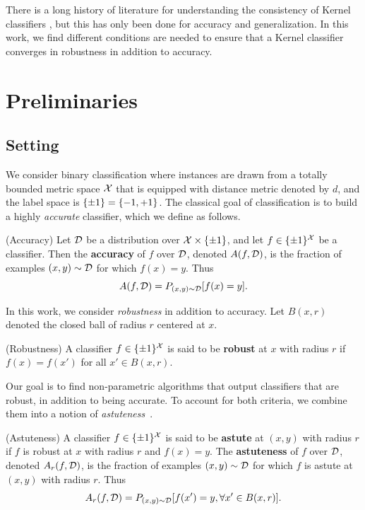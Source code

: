 There is a long history of literature for understanding the consistency of Kernel classifiers \cite{Steinwart05, Stone77}, but this has only been done for accuracy and generalization. In this work, we find different conditions are needed to ensure that a Kernel classifier converges in robustness in addition to accuracy.

\section{Preliminaries}

\subsection{Setting}
We consider binary classification where instances are drawn from a totally bounded metric space $\mathcal X$ that is equipped with distance metric denoted by $d$, and the label space is $\{\pm 1\} = \{ -1, +1 \}$. The classical goal of classification is to build a highly \textit{accurate} classifier, which we define as follows.

\begin{defn}
(Accuracy) Let ${\mathcal D}$ be a distribution over $\mathcal X \times \{\pm 1\}$, and let $f \in \{\pm 1\}^\mathcal X$ be a classifier. Then the \textbf{accuracy} of $f$ over ${\mathcal D}$, denoted $A(f, {\mathcal D})$, is the fraction of examples $(x,y) \sim {\mathcal D}$ for which $f(x) = y$. Thus $$A(f, {\mathcal D}) = P_{(x,y) \sim {\mathcal D}}[f(x) = y].$$
\end{defn}

In this work, we consider \textit{robustness} in addition to accuracy. Let $B(x,r)$ denoted the closed ball of radius $r$ centered at $x$. 

\begin{defn}
(Robustness) A classifier $f \in \{\pm 1\}^\mathcal X$ is said to be \textbf{robust} at $x$ with radius $r$ if $f(x) = f(x')$ for all $x' \in B(x,r)$.
\end{defn}

Our goal is to find non-parametric algorithms that output classifiers that are robust, in addition to being accurate. To account for both criteria, we combine them into a notion of \textit{astuteness}~\cite{WJC18, Madry18}. 

\begin{defn}
(Astuteness) A classifier $f \in \{\pm 1\}^\mathcal X$ is said to be \textbf{astute} at $(x,y)$ with radius $r$ if $f$ is robust at $x$ with radius $r$ and $f(x) = y$. The \textbf{astuteness} of $f$ over ${\mathcal D}$, denoted $A_r(f, {\mathcal D})$, is the fraction of examples $(x,y) \sim {\mathcal D}$ for which $f$ is astute at $(x,y)$ with radius $r$. Thus $$A_r(f, {\mathcal D}) = P_{(x, y) \sim {\mathcal D}}[f(x') = y, \forall x' \in B(x,r)].$$
\end{defn}

